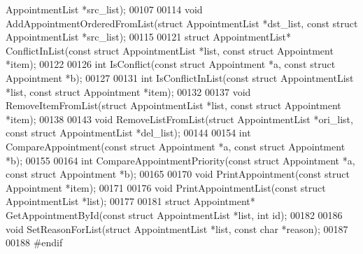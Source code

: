 \begin{DoxyCode}
      AppointmentList *src\_list);
00107 
00114 \textcolor{keywordtype}{void} AddAppointmentOrderedFromList(\textcolor{keyword}{struct} AppointmentList *dst\_list, \textcolor{keyword}{const} \textcolor{keyword}{struct} 
      AppointmentList *src\_list);
00115 
00121 \textcolor{keyword}{struct }AppointmentList* ConflictInList(\textcolor{keyword}{const} \textcolor{keyword}{struct} AppointmentList *list, \textcolor{keyword}{const} \textcolor{keyword}{struct} 
      Appointment *item);
00122 
00126 \textcolor{keywordtype}{int} IsConflict(\textcolor{keyword}{const} \textcolor{keyword}{struct} Appointment *a, \textcolor{keyword}{const} \textcolor{keyword}{struct} Appointment *b);
00127 
00131 \textcolor{keywordtype}{int} IsConflictInList(\textcolor{keyword}{const} \textcolor{keyword}{struct} AppointmentList *list, \textcolor{keyword}{const} \textcolor{keyword}{struct} 
      Appointment *item);
00132 
00137 \textcolor{keywordtype}{void} RemoveItemFromList(\textcolor{keyword}{struct} AppointmentList *list, \textcolor{keyword}{const} \textcolor{keyword}{struct} Appointment *item);
00138 
00143 \textcolor{keywordtype}{void} RemoveListFromList(\textcolor{keyword}{struct} AppointmentList *ori\_list, \textcolor{keyword}{const} \textcolor{keyword}{struct} 
      AppointmentList *del\_list);
00144 
00154 \textcolor{keywordtype}{int} CompareAppointment(\textcolor{keyword}{const} \textcolor{keyword}{struct} Appointment *a, \textcolor{keyword}{const} \textcolor{keyword}{struct} Appointment *b);
00155 
00164 \textcolor{keywordtype}{int} CompareAppointmentPriority(\textcolor{keyword}{const} \textcolor{keyword}{struct} Appointment *a, \textcolor{keyword}{const} \textcolor{keyword}{struct} 
      Appointment *b);
00165 
00170 \textcolor{keywordtype}{void} PrintAppointment(\textcolor{keyword}{const} \textcolor{keyword}{struct} Appointment *item);
00171 
00176 \textcolor{keywordtype}{void} PrintAppointmentList(\textcolor{keyword}{const} \textcolor{keyword}{struct} AppointmentList *list);
00177 
00181 \textcolor{keyword}{struct }Appointment* GetAppointmentById(\textcolor{keyword}{const} \textcolor{keyword}{struct} AppointmentList *list, \textcolor{keywordtype}{int} \textcolor{keywordtype}{id});
00182 
00186 \textcolor{keywordtype}{void} SetReasonForList(\textcolor{keyword}{struct} AppointmentList *list, \textcolor{keyword}{const} \textcolor{keywordtype}{char} *reason);
00187 
00188 \textcolor{preprocessor}{#endif}
\end{DoxyCode}

